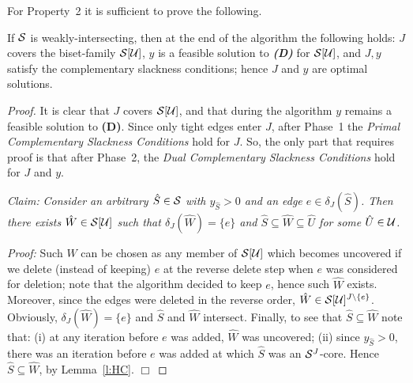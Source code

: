 For Property~2 it is sufficient to prove the following.

\begin{lemma} If ${\cal S}$ is weakly-intersecting, then at the end of the algorithm the following holds: 
$J$ co\-vers the biset-family ${\cal S}[{\cal U}]$,
$y$ is a feasible solution to {\em \bf (D)} for ${\cal S}[{\cal U}]$, 
and $J,y$ satisfy the complementary slackness conditions;
hence $J$ and $y$ are optimal solutions.
\end{lemma}
\begin{proof}
It is clear that $J$ covers ${\cal S}[{\cal U}]$, 
and that during the algorithm $y$ remains a feasible solution to {\bf (D)}.
Since only tight edges enter $J$, after Phase~1 the {\em Primal Complementary Slackness Conditions} hold for $J$.
So, the only part that requires proof is that after Phase~2, the 
{\em Dual Complementary Slackness Conditions} hold for $J$ and $y$.

\vspace{0.1cm}

\noindent
{\em  Claim:}
{\em Consider an arbitrary $\hat{S} \in {\cal S}$ with $y_{\hat{S}}>0$ and an edge $e \in \delta_J(\hat{S})$.
Then there exists $\hat{W} \in {\cal S}[{\cal U}]$ such that $\delta_J(\hat{W})=\{e\}$ and 
$\hat{S} \subseteq \hat{W} \subseteq \hat{U}$ for some $\hat{U} \in {\cal U}$.}

\vspace{0.1cm}

\noindent
{\em Proof:}
Such $\hat{W}$ can be chosen as any member of ${\cal S}[{\cal U}]$
which becomes uncovered if we delete (instead of keeping)
$e$ at the reverse delete step when $e$ was considered for deletion;
note that the algorithm decided to keep $e$, hence such $\hat{W}$ exists.
Moreover, since the edges were deleted in the reverse order,
$\hat{W} \in {\cal S}[{\cal U}]^{J \setminus\{e\}}$. 
Obviously, $\delta_J(\hat{W})=\{e\}$ and $\hat{S}$ and $\hat{W}$ intersect.
Finally, to see that $\hat{S} \subseteq \hat{W}$ note that: 
(i) at any iteration before $e$ was added, $\hat{W}$ was uncovered;
(ii) since $y_{\hat{S}}>0$, there was an iteration before $e$ was added 
at which $\hat{S}$ was an ${\cal S}^J$-core. Hence $\hat{S} \subseteq \hat{W}$, by Lemma~\ref{l:HC}. 
\hfill $\Box$


\end{proof}
